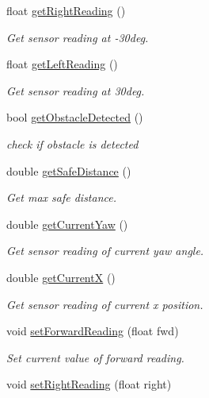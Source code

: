 \begin{DoxyCompactItemize}
float \mbox{\hyperlink{class_sensor_a784ee9b741908df505a51d0807dbbe9b}{get\+Right\+Reading}} ()
\begin{DoxyCompactList}\small\item\em Get sensor reading at -\/30deg. \end{DoxyCompactList}\item 
float \mbox{\hyperlink{class_sensor_a68826b1eb0dcda3a0508f213a42db25b}{get\+Left\+Reading}} ()
\begin{DoxyCompactList}\small\item\em Get sensor reading at 30deg. \end{DoxyCompactList}\item 
bool \mbox{\hyperlink{class_sensor_af590a94a155718952a71ee842a0db661}{get\+Obstacle\+Detected}} ()
\begin{DoxyCompactList}\small\item\em check if obstacle is detected \end{DoxyCompactList}\item 
double \mbox{\hyperlink{class_sensor_a1b7aad1c82fa6df205b166b311f45447}{get\+Safe\+Distance}} ()
\begin{DoxyCompactList}\small\item\em Get max safe distance. \end{DoxyCompactList}\item 
double \mbox{\hyperlink{class_sensor_a1984ff9826d1c92d7e91add776a4107b}{get\+Current\+Yaw}} ()
\begin{DoxyCompactList}\small\item\em Get sensor reading of current yaw angle. \end{DoxyCompactList}\item 
double \mbox{\hyperlink{class_sensor_a933dfb180d498c41862b5e14675cc97d}{get\+CurrentX}} ()
\begin{DoxyCompactList}\small\item\em Get sensor reading of current x position. \end{DoxyCompactList}\item 
void \mbox{\hyperlink{class_sensor_ae406fca85ea14092ddc0857cf1c00f13}{set\+Forward\+Reading}} (float fwd)
\begin{DoxyCompactList}\small\item\em Set current value of forward reading. \end{DoxyCompactList}\item 
void \mbox{\hyperlink{class_sensor_a6549b1585b750c48673def64a199bac1}{set\+Right\+Reading}} (float right)

\end{DoxyCompactItemize}
